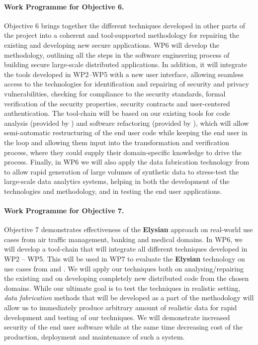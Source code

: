 \documentclass[a4paper,11pt]{article}
\newcommand{\project}[1]{\textbf{#1}\xspace}
\newcommand{\SECURITY}{\project{Elysian}}
\newcommand{\TheProject}{\SECURITY}
\begin{document}
\paragraph{Work Programme for Objective 6.} 

Objective 6  brings together the different techniques developed in other parts of the project into a coherent and tool-supported methodology for repairing the existing and developing new secure applications. WP6 will develop the methodology, outlining all the steps in the software engineering process of building secure large-scale distributed applications. In addition, it will integrate the tools developed in WP2--WP5 with a new user interface, allowing seamless access to the technologies for identification and repairing of security and privacy vulnerabilities, checking for compliance to the security standards, formal verification of the security properties, security contracts and user-centered authentication. The tool-chain will be based on our existing tools for code analysis (provided by \YAGshort{}) and software refactoring (provided by \SAshort{}), which will allow semi-automatic restructuring of the end user code while keeping the end user in the loop and allowing them input into the transformation and verification process, where they could supply their domain-specific knowledge to drive the process. Finally, in WP6 we will also apply the data fabrication technology from \IBMshort{} to allow rapid generation of large volumes of synthetic data to stress-test the large-scale data analytics systems, helping in both the development of the technologies and methodology, and in testing the end user applications.

\paragraph{Work Programme for Objective 7.} 

Objective 7 demonstrates effectiveness of the \TheProject{} approach on real-world use cases from air traffic management, %
banking and medical domains. In WP6, we will develop a tool-chain that will integrate all different techniques developed in WP2 -- WP5. This will be used in WP7 to evaluate the \TheProject{} technology  on use cases from \SOPRAshort{} and \FRQshort{}. We will apply our techniques both on analysing/repairing the existing and on developing completely new distributed code from the chosen domains. While our ultimate goal is to test the techniques in realistic setting, \emph{data fabrication} methods that will be developed as a part of the methodology will allow us to immediately produce arbitrary amount of realistic data for rapid development and testing of our techniques. We will demonstrate increased security of the end user software while at the same time decreasing cost of the production, deployment and maintenance of such a system.
\end{document}
